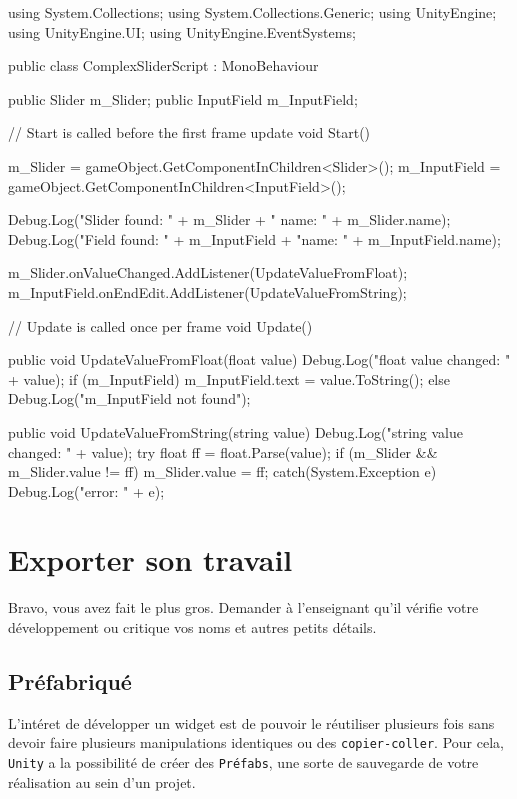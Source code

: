 \documentclass[a4paper,10pt]{article}
\newenvironment{solution}%
{\begin{tcolorbox}[breakable,colback=red!5!white,colframe=red!75!black,title=Solution]}%
{\end{tcolorbox}}
\newenvironment{boxcode}%
{\begin{tcolorbox}[breakable,colback=gray!5!white,colframe=black]}%
	{\end{tcolorbox}}
\begin{document}
\begin{solution}
\begin{boxcode}
\begin{csharpsansbord}
using System.Collections;
using System.Collections.Generic;
using UnityEngine;
using UnityEngine.UI;
using UnityEngine.EventSystems;

public class ComplexSliderScript : MonoBehaviour 
{
	public Slider m_Slider;
	public InputField m_InputField;
	
	// Start is called before the first frame update
	void Start()
	{
		m_Slider = gameObject.GetComponentInChildren<Slider>();
		m_InputField = gameObject.GetComponentInChildren<InputField>();
		
		Debug.Log("Slider found: " + m_Slider  + " name: " + m_Slider.name);
		Debug.Log("Field found: " + m_InputField + "name: " + m_InputField.name);
		
		m_Slider.onValueChanged.AddListener(UpdateValueFromFloat);
		m_InputField.onEndEdit.AddListener(UpdateValueFromString);
	}
	
	// Update is called once per frame
	void Update()	{ }
	
	public void UpdateValueFromFloat(float value)
	{
		Debug.Log("float value changed: " + value);
		if (m_InputField) { m_InputField.text = value.ToString(); }
		else Debug.Log("m_InputField not found");
	}
	
	public void UpdateValueFromString(string value)
	{
		Debug.Log("string value changed: " + value);
		try
		{
			float ff = float.Parse(value);
			if (m_Slider && m_Slider.value != ff) { m_Slider.value = ff; }
		}
		catch(System.Exception e) {
			Debug.Log("error: " + e);
		}
	}
}
		
\end{csharpsansbord}
\end{boxcode}		

\end{solution}
\fi 

\section{Exporter son travail}

Bravo, vous avez fait le plus gros. Demander à l'enseignant  qu'il vérifie votre développement ou critique vos noms et autres petits détails.

\subsection{Préfabriqué}
L'intéret de développer un widget est de pouvoir le réutiliser plusieurs fois sans devoir faire plusieurs manipulations identiques ou des \texttt{copier-coller}. Pour cela, \texttt{Unity} a la possibilité de créer des \texttt{Préfabs}, une sorte de sauvegarde de votre réalisation au sein d'un projet.
\end{document}
